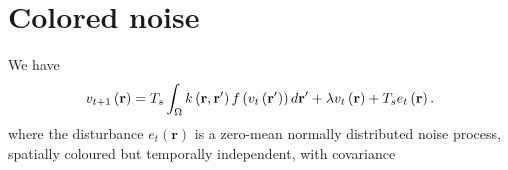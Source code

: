 \documentclass[onecolumn,draftcls]{IEEEtran}
\begin{document}
% 

\section{Colored noise}
We have
\begin{equation}
v_{t + 1}\left( \mathbf{r} \right)  = T_s\int_\Omega  {k\left( {{\bf{r}} , {\bf{r'}}} \right)f\left( {{v_t}\left( \bf{r'} \right)} \right)d{\bf{r'}}} + \lambda v_t\left( {\bf{r}} \right) + T_se_t\left( {\mathbf{r}} \right).
\end{equation}
where the disturbance $e_t(\mathbf r)$ is a zero-mean normally distributed noise process, spatially coloured but temporally independent, with covariance 
\end{document}
